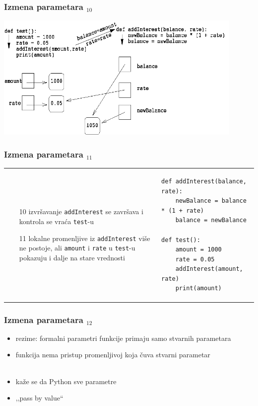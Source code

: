\documentclass[compress]{beamer}
\begin{document}
\begin{frame}[fragile,shrink=10]
  \frametitle{Izmena parametara $_{10}$}
\begin{center}
  \includegraphics[width=12cm]{pic10}
\end{center}
\end{frame}

\begin{frame}[fragile,shrink=10]
  \frametitle{Izmena parametara $_{11}$}
\begin{tabular}{p{4cm}p{8cm}}
  \begin{itemize}
    \item[10] izvršavanje \texttt{addInterest} se završava i kontrola se vraća \texttt{test}-u
    \item[11] lokalne promenljive iz \texttt{addInterest} više ne postoje, ali \texttt{amount} i \texttt{rate} u \texttt{test}-u pokazuju i dalje na stare vrednosti
  \end{itemize}
&
\begin{verbatim}
def addInterest(balance, rate):
    newBalance = balance * (1 + rate)
    balance = newBalance

def test():
    amount = 1000
    rate = 0.05
    addInterest(amount, rate)
    print(amount)
\end{verbatim}
\end{tabular}
\end{frame}

\begin{frame}[fragile]
  \frametitle{Izmena parametara $_{12}$}
  \begin{itemize}
    \item rezime: formalni parametri funkcije primaju samo  stvarnih parametara
    \item funkcija nema pristup promenljivoj koja čuva stvarni parametar \\ \ \\
    \item kaže se da Python sve parametre 
    \item ,,pass by value``
  \end{itemize}
\end{frame}
\end{document}

